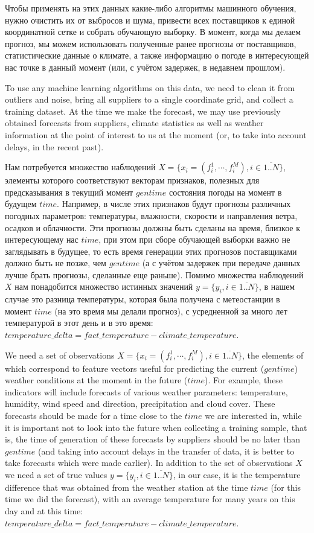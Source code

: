 \documentclass[14pt]{matmex-diploma}
\begin{document}
Чтобы применять на этих данных какие-либо алгоритмы машинного обучения, нужно очистить их от выбросов и шума, привести всех поставщиков к единой координатной сетке и собрать обучающую выборку. В момент, когда мы делаем прогноз, мы можем использовать полученные ранее прогнозы от поставщиков, статистические данные о климате, а также информацию о погоде в интересующей нас точке в данный момент (или, с учётом задержек, в недавнем прошлом).

To use any machine learning algorithms on this data, we need to clean it from outliers and noise, bring all suppliers to a single coordinate grid, and collect a training dataset. At the time we make the forecast, we may use previously obtained forecasts from suppliers, climate statistics as well as weather information at the point of interest to us at the moment (or, to take into account delays, in the recent past).

Нам потребуется множество наблюдений $X = \{x_i = (f^1_{i}, \cdots, f^M_i), i \in \overline{1..N}\}$, элементы которого соответствуют векторам признаков, полезных для предсказывания в текущий момент $gentime$ состояния погоды на момент в будущем $time$. Например, в числе этих признаков будут прогнозы различных погодных параметров: температуры, влажности, скорости и направления ветра, осадков и облачности. Эти прогнозы должны быть сделаны на время, близкое к интересующему нас $time$, при этом при сборе обучающей выборки важно не заглядывать в будущее, то есть время генерации этих прогнозов поставщиками должно быть не позже, чем $gentime$ (а с учётом задержек при передаче данных лучше брать прогнозы, сделанные еще раньше). Помимо множества наблюдений $X$ нам понадобится множество истинных значений $y = \{y_i, i \in \overline{1..N}\}$, в нашем случае это разница температуры, которая была получена с метеостанции в момент $time$ (на это время мы делали прогноз), с усредненной за много лет температурой в этот день и в это время: $temperature\_delta = fact\_temperature - climate\_temperature$.


We need a set of observations $X = \{x_i = (f^1_{i}, \cdots, f^M_i), i \in \overline{1..N}\}$, the elements of which correspond to feature vectors useful for predicting the current ($gentime$) weather conditions at the moment in the future ($time$). For example, these indicators will include forecasts of various weather parameters: temperature, humidity, wind speed and direction, precipitation and cloud cover. These forecasts should be made for a time close to the $time$ we are interested in, while it is important not to look into the future when collecting a training sample, that is, the time of generation of these forecasts by suppliers should be no later than $gentime$ (and taking into account delays in the transfer of data, it is better to take forecasts which were made earlier). In addition to the set of observations $X$ we need a set of true values $y = \{y_i, i \in \overline{1..N}\}$, in our case, it is the temperature difference that was obtained from the weather station at the time $time$ (for this time we did the forecast), with an average temperature for many years on this day and at this time: $temperature\_delta = fact\_temperature - climate\_temperature$.
\end{document}
